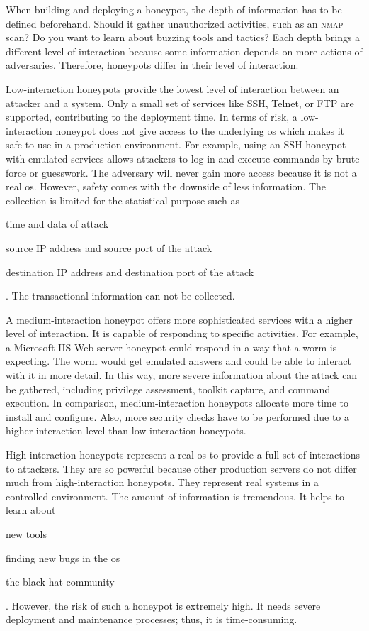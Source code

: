 When building and deploying a honeypot, the depth of information has to be defined beforehand.
Should it gather unauthorized activities, such as an \textsc{nmap} scan?
Do you want to learn about buzzing tools and tactics?
Each depth brings a different level of interaction because some information depends on more actions of adversaries.
Therefore, honeypots differ in their level of interaction.

Low-interaction honeypots provide the lowest level of interaction between an attacker and a system.
Only a small set of services like SSH, Telnet, or FTP are supported, contributing to the deployment time.
In terms of risk, a low-interaction honeypot does not give access to the underlying \ac{os} which makes it safe to use in a production environment.
For example, using an SSH honeypot with emulated services allows attackers to log in and execute commands by brute force or guesswork.
The adversary will never gain more access because it is not a real \ac{os}.
However, safety comes with the downside of less information.
The collection is limited for the statistical purpose such as
\begin{enumerate*}[label=(\roman*)]
    \item time and data of attack
    \item source IP address and source port of the attack
    \item destination IP address and destination port of the attack
\end{enumerate*}.
The transactional information can not be collected. \cite{Spitzner2003}

A medium-interaction honeypot offers more sophisticated services with a higher level of interaction.
It is capable of responding to specific activities.
For example, a Microsoft IIS Web server honeypot could respond in a way that a worm is expecting.
The worm would get emulated answers and could be able to interact with it in more detail.
In this way, more severe information about the attack can be gathered, including privilege assessment, toolkit capture, and command execution.
In comparison, medium-interaction honeypots allocate more time to install and configure.
Also, more security checks have to be performed due to a higher interaction level than low-interaction honeypots. \cite{Spitzner2003}

High-interaction honeypots represent a real \ac{os} to provide a full set of interactions to attackers.
They are so powerful because other production servers do not differ much from high-interaction honeypots.
They represent real systems in a controlled environment.
The amount of information is tremendous.
It helps to learn about
\begin{enumerate*}[label=(\roman*)]
    \item new tools
    \item finding new bugs in the \ac{os}
    \item the black hat community
\end{enumerate*}.
However, the risk of such a honeypot is extremely high.
It needs severe deployment and maintenance processes; thus, it is time-consuming.

